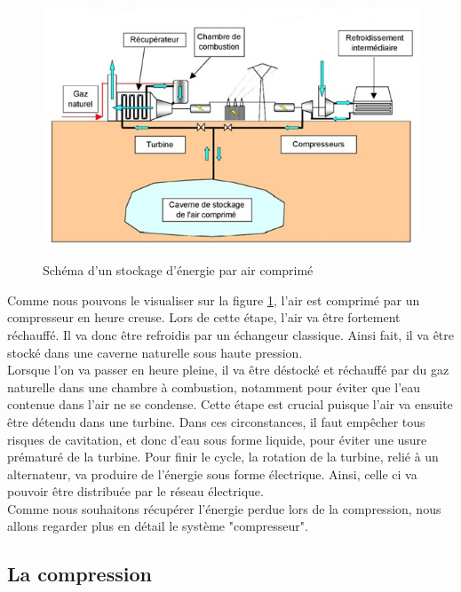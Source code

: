 \begin{figure}[!h]
\centering

\includegraphics[scale=0.7]{PHOTO/shema_base.jpg}
\label{sh_base}
\caption{Schéma d'un stockage d'énergie par air comprimé}
\end{figure}

Comme nous pouvons le visualiser sur la figure \ref{sh_base}, l'air est comprimé par un compresseur en heure creuse. Lors de cette étape, l'air va être fortement réchauffé. Il va donc être refroidis par un échangeur classique. Ainsi fait, il va être stocké dans une caverne naturelle sous haute pression.\\


Lorsque l'on va passer en heure pleine, il va être déstocké et réchauffé par du gaz naturelle dans une chambre à combustion, notamment pour éviter que l'eau contenue dans l'air ne se condense. Cette étape est crucial puisque l'air va ensuite être détendu dans une turbine. Dans ces circonstances, il faut empêcher tous risques de cavitation, et donc d'eau sous forme liquide, pour éviter une usure prématuré de la turbine. Pour finir le cycle, la rotation de la turbine, relié à un alternateur, va produire de l'énergie sous forme électrique. Ainsi, celle ci va pouvoir être distribuée par le réseau électrique.\\


Comme nous souhaitons récupérer l'énergie perdue lors de la compression, nous allons regarder plus en détail le système "compresseur".

\subsection{La compression}
 
